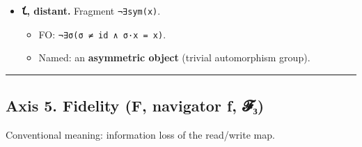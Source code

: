 \begin{itemize}
  \begin{itemize}
  \tightlist
  \item
    FO: \texttt{(∀g\ ∈\ G)(g·x\ =\ x)}.
  \item
    Named: a \textbf{G-invariant / fixed point of the group action}
    (full stabilizer).
  \end{itemize}
\item
  \textbf{𐑗, distant.} Fragment \texttt{¬∃sym(x)}.

  \begin{itemize}
  \tightlist
  \item
    FO: \texttt{¬∃σ(σ\ ≠\ id\ ∧\ σ·x\ =\ x)}.
  \item
    Named: an \textbf{asymmetric object} (trivial automorphism group).
  \end{itemize}
\end{itemize}

\begin{center}\rule{0.5\linewidth}{0.5pt}\end{center}

\hypertarget{axis-5.-fidelity-f-navigator-ux192-ux1d4d5ux2083}{%
\subsection{Axis 5. Fidelity (F, navigator ƒ,
𝓕₃)}\label{axis-5.-fidelity-f-navigator-ux192-ux1d4d5ux2083}}

Conventional meaning: information loss of the read/write map.

